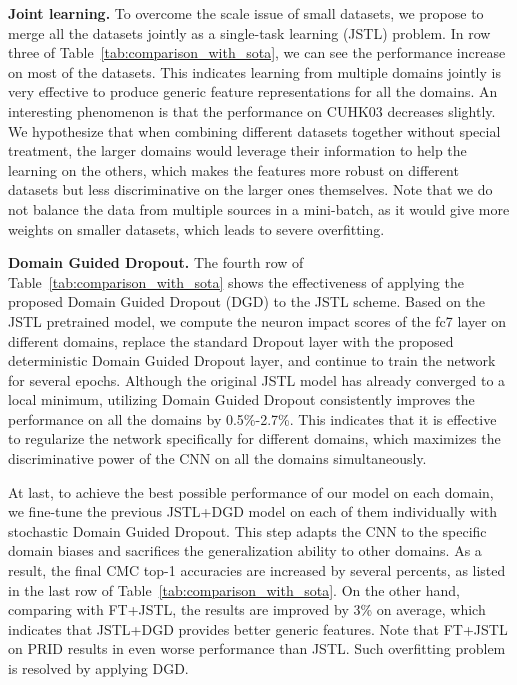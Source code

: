 \textbf{Joint learning.} To overcome the scale issue of small datasets, we propose to merge all the datasets jointly as a single-task learning (JSTL) problem. In row three of Table~\ref{tab:comparison_with_sota}, we can see the performance increase on most of the datasets. This indicates learning from multiple domains jointly is very effective to produce generic feature representations for all the domains. An interesting phenomenon is that the performance on CUHK03 decreases slightly. We hypothesize that when combining different datasets together without special treatment, the larger domains would leverage their information to help the learning on the others, which makes the features more robust on different datasets but less discriminative on the larger ones themselves. Note that we do not balance the data from multiple sources in a mini-batch, as it would give more weights on smaller datasets, which leads to severe overfitting.

\textbf{Domain Guided Dropout.} The fourth row of Table~\ref{tab:comparison_with_sota} shows the effectiveness of applying the proposed Domain Guided Dropout (DGD) to the JSTL scheme. Based on the JSTL pretrained model, we compute the neuron impact scores of the fc7 layer on different domains, replace the standard Dropout layer with the proposed deterministic Domain Guided Dropout layer, and continue to train the network for several epochs. Although the original JSTL model has already converged to a local minimum, utilizing Domain Guided Dropout consistently improves the performance on all the domains by 0.5\%-2.7\%. This indicates that it is effective to regularize the network specifically for different domains, which maximizes the discriminative power of the CNN on all the domains simultaneously.

At last, to achieve the best possible performance of our model on each domain, we fine-tune the previous JSTL+DGD model on each of them individually with stochastic Domain Guided Dropout. This step adapts the CNN to the specific domain biases and sacrifices the generalization ability to other domains. As a result, the final CMC top-1 accuracies are increased by several percents, as listed in the last row of Table~\ref{tab:comparison_with_sota}. On the other hand, comparing with FT+JSTL, the results are improved by 3\% on average, which indicates that JSTL+DGD provides better generic features. Note that FT+JSTL on PRID results in even worse performance than JSTL. Such overfitting problem is resolved by applying DGD.

